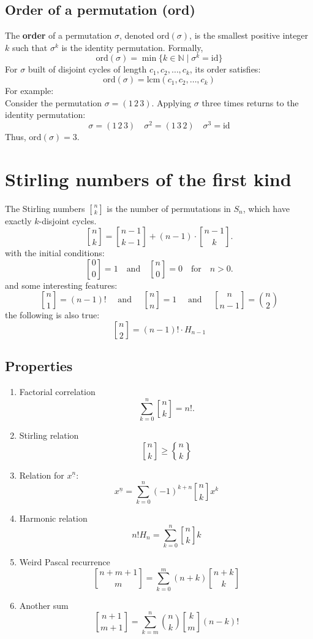 \documentclass{article}
\begin{document}
\subsection{Order of a permutation (ord)}
The \textbf{order} of a permutation \(\sigma\), denoted \(\text{ord}(\sigma)\), is the smallest positive integer \(k\) such that \(\sigma^k\) is the identity permutation. Formally,
\[
\text{ord}(\sigma) = \min \{ k \in \mathbb{N} \mid \sigma^k = \text{id} \}
\]
For \(\sigma\) built of disjoint cycles of length \(c_1,c_2,\dots,c_k\), its order satisfies:
\[\text{ord}(\sigma)=\text{lcm}(c_1,c_2,\dots,c_k)\]
For example:\\
Consider the permutation \(\sigma = (1\, 2\, 3)\). Applying \(\sigma\) three times returns to the identity permutation:
\[
\sigma = (1\, 2\, 3) \quad \sigma^2 = (1\, 3\, 2) \quad \sigma^3 = \text{id}
\]
Thus, \(\text{ord}(\sigma) = 3\).

\section{Stirling numbers of the first kind}

The Stirling numbers \(\genfrac[]{0pt}{1}{n}{k}\) is the number of permutations in \(S_n\), which have exactly $k$-disjoint cycles.
\[
\genfrac[]{0pt}{0}{n}{k}= \genfrac[]{0pt}{0}{n-1}{k-1} + (n-1)\cdot \genfrac[]{0pt}{0}{n-1}{k}.
\]
with the initial conditions:
\[
\genfrac[]{0pt}{0}{0}{0} = 1 \quad \text{and} \quad \genfrac[]{0pt}{0}{n}{0} = 0 \quad \text{for} \quad n > 0.
\]
and some interesting features:
\[
\genfrac[]{0pt}{0}{n}{1} = (n-1)! \quad \text{ and } \quad \genfrac[]{0pt}{0}{n}{n} = 1 \quad \text{ and } \quad \genfrac[]{0pt}{0}{n}{n-1} = \binom{n}{2}
\]
the following is also true:
\[
\genfrac[]{0pt}{0}{n}{2} = (n-1)!\cdot H_{n-1}
\]

\subsection{Properties}

\begin{enumerate}
    \item Factorial correlation
    \[
    \sum_{k=0}^n \genfrac[]{0pt}{0}{n}{k} = n!.
    \]
    \item Stirling relation
    \[
    \genfrac[]{0pt}{0}{n}{k} \geq \genfrac\{\}{0pt}{0}{n}{k}
    \]
    \item Relation for $x^{\underline{n}}$:
    \[
    x^{\underline{n}} = \sum_{k=0}^{n} (-1)^{k+n} \genfrac[]{0pt}{0}{n}{k} x^k
    \]
    \item Harmonic relation
    \[
    n! H_{n} = \sum_{k=0}^{n} \genfrac[]{0pt}{0}{n}{k} k
    \]
    \item Weird Pascal recurrence
    \[
    \genfrac[]{0pt}{0}{n+m+1}{m} = \sum_{k=0}^{m} (n+k) \genfrac[]{0pt}{0}{n+k}{k}
    \]
    \item Another sum
    \[
    \genfrac[]{0pt}{0}{n+1}{m+1} = \sum_{k=m}^{n} \binom{n}{k}\genfrac[]{0pt}{0}{k}{m} (n-k)!
    \]
\end{enumerate}
\end{document}
